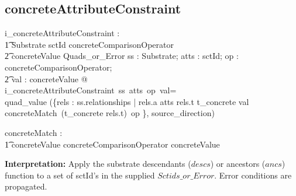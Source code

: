\documentclass{article}
\begin{document}
\subsection{concreteAttributeConstraint}


\begin{gendef}
  i\_concreteAttributeConstraint : \\
\t1 Substrate \fun \power sctId \fun concreteComparisonOperator \fun\\
\t2 concreteValue \fun Quads\_or\_Error
\where
   \forall ss : Substrate; atts : \power sctId; op : concreteComparisonOperator; \\
\t2 val : concreteValue @ \\
i\_concreteAttributeConstraint~ss~atts~op~val= \\
quad\_value (\{rels : ss.relationships | rels.a \in atts \land rels.t \in \ran t\_concrete \land val \in concreteMatch~(t\_concrete \inv rels.t)~op \}, source\_direction)
\end{gendef}

\begin{gendef}
   concreteMatch : \\
\t1 concreteValue \fun concreteComparisonOperator \fun \power concreteValue 
\end{gendef}

\noindent
\textbf{Interpretation:}  Apply the substrate descendants ($descs$) or ancestors ($ancs$) function to a set of sctId's in the supplied
$Sctids\_or\_Error$.  Error conditions are propagated.
\end{document}

